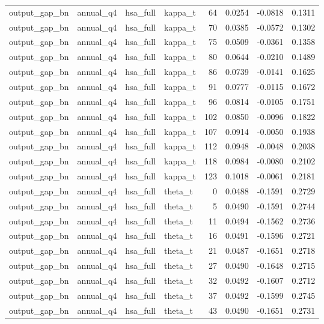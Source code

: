 \begin{tabular}{llllrrrr}
output\_gap\_bn & annual\_q4 & hsa\_full & kappa\_t & 64 & 0.0254 & -0.0818 & 0.1311 \\
output\_gap\_bn & annual\_q4 & hsa\_full & kappa\_t & 70 & 0.0385 & -0.0572 & 0.1302 \\
output\_gap\_bn & annual\_q4 & hsa\_full & kappa\_t & 75 & 0.0509 & -0.0361 & 0.1358 \\
output\_gap\_bn & annual\_q4 & hsa\_full & kappa\_t & 80 & 0.0644 & -0.0210 & 0.1489 \\
output\_gap\_bn & annual\_q4 & hsa\_full & kappa\_t & 86 & 0.0739 & -0.0141 & 0.1625 \\
output\_gap\_bn & annual\_q4 & hsa\_full & kappa\_t & 91 & 0.0777 & -0.0115 & 0.1672 \\
output\_gap\_bn & annual\_q4 & hsa\_full & kappa\_t & 96 & 0.0814 & -0.0105 & 0.1751 \\
output\_gap\_bn & annual\_q4 & hsa\_full & kappa\_t & 102 & 0.0850 & -0.0096 & 0.1822 \\
output\_gap\_bn & annual\_q4 & hsa\_full & kappa\_t & 107 & 0.0914 & -0.0050 & 0.1938 \\
output\_gap\_bn & annual\_q4 & hsa\_full & kappa\_t & 112 & 0.0948 & -0.0048 & 0.2038 \\
output\_gap\_bn & annual\_q4 & hsa\_full & kappa\_t & 118 & 0.0984 & -0.0080 & 0.2102 \\
output\_gap\_bn & annual\_q4 & hsa\_full & kappa\_t & 123 & 0.1018 & -0.0061 & 0.2181 \\
output\_gap\_bn & annual\_q4 & hsa\_full & theta\_t & 0 & 0.0488 & -0.1591 & 0.2729 \\
output\_gap\_bn & annual\_q4 & hsa\_full & theta\_t & 5 & 0.0490 & -0.1591 & 0.2744 \\
output\_gap\_bn & annual\_q4 & hsa\_full & theta\_t & 11 & 0.0494 & -0.1562 & 0.2736 \\
output\_gap\_bn & annual\_q4 & hsa\_full & theta\_t & 16 & 0.0491 & -0.1596 & 0.2721 \\
output\_gap\_bn & annual\_q4 & hsa\_full & theta\_t & 21 & 0.0487 & -0.1651 & 0.2718 \\
output\_gap\_bn & annual\_q4 & hsa\_full & theta\_t & 27 & 0.0490 & -0.1648 & 0.2715 \\
output\_gap\_bn & annual\_q4 & hsa\_full & theta\_t & 32 & 0.0492 & -0.1607 & 0.2712 \\
output\_gap\_bn & annual\_q4 & hsa\_full & theta\_t & 37 & 0.0492 & -0.1599 & 0.2745 \\
output\_gap\_bn & annual\_q4 & hsa\_full & theta\_t & 43 & 0.0490 & -0.1651 & 0.2731 \\

\end{tabular}
